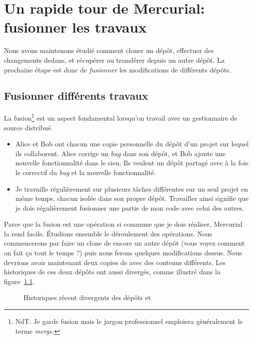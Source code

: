 \chapter{Un rapide tour de Mercurial: fusionner les travaux}
\label{chap:tour-merge}

Nous avons maintenons étudié comment cloner un dépôt, effectuer
des changements dedans, et récupérer ou transférer depuis un 
autre dépôt. La prochaine étape est donc de \emph{fusionner} les
modifications de différents dépôts.

\section{Fusionner différents travaux} %
La fusion\footnote{NdT: Je garde fusion mais le jargon professionnel 
emploiera généralement le terme \textit{merge}.} est un aspect 
fondamental lorsqu'on travail avec un gestionnaire de source 
distribué.
\begin{itemize}
\item Alice et Bob ont chacun une copie personnelle du dépôt d'un
  projet sur lequel ils collaborent. Alice corrige un \textit{bug} 
  dans son dépôt, et Bob ajoute une nouvelle fonctionnalité dans le
  sien. Ils veulent un dépôt partagé avec à la fois le correctif du
  \textit{bug} et la nouvelle fonctionnalité.
\item Je travaille régulièrement sur plusieurs tâches différentes sur
  un seul projet en même temps, chacun isolée dans son propre dépôt.
  Travailler ainsi signifie que je dois régulièrement fusionner une 
  partie de mon code avec celui des autres.
\end{itemize}

Parce que la fusion est une opération si commune que je dois réaliser,
Mercurial la rend facile. Étudions ensemble le déroulement des opérations.
Nous commencerons par faire un clone de encore un autre dépôt (vous voyez
comment on fait ça tout le temps ?) puis nous ferons quelques modifications
dessus.
Nous devrions avoir maintenant deux copies de  avec 
des contenus différents. Les historiques de ces deux dépôts ont aussi 
divergés, comme illustré dans la figure~\ref{fig:tour-merge:sep-repos}.


\begin{figure}[ht]
  \centering
  \caption{Historiques récent divergents des dépôts  
  et }
  \label{fig:tour-merge:sep-repos}
\end{figure}

